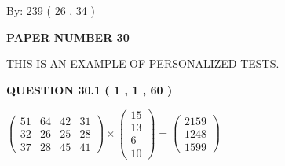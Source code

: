\documentclass[12pt]{article}
\begin{document}
   
\hspace{1.0in} By: 
 239 ( 26 ,  34 )
   
   
   
   
\newpage 
\setcounter{page}{ 
    30001 } 
   
   
   
   
 {\textbf{ \Large{ PAPER NUMBER  30  }}}
   
   
\vspace{0.2in}
   
   
   
   
   
   
 \vspace{0.2in}
{\Huge  THIS IS AN EXAMPLE OF}
{\Huge  PERSONALIZED TESTS. }
   
   
  
\vspace{0.2in}
  
{\textbf{\Large{QUESTION
30.1 
 ( 1 , 1 , 60 )
}}}
  
  
 
 
\noindent{}

 
$\left( \begin{array}{ccccccccccccccc}
 51  & 
 64  & 
 42  & 
 31  \\ 
 32  & 
 26  & 
 25  & 
 28  \\ 
 37  & 
 28  & 
 45  & 
 41
\end{array}\right) \times
\left( \begin{array}{c}
 15  \\ 
 13  \\ 
 6  \\ 
 10
\end{array}\right)  =
\left( \begin{array}{c}
 2159  \\ 
 1248  \\ 
 1599
\end{array}\right)  $
 
\end{document}
